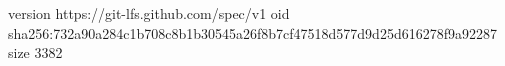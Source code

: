 version https://git-lfs.github.com/spec/v1
oid sha256:732a90a284c1b708c8b1b30545a26f8b7cf47518d577d9d25d616278f9a92287
size 3382
